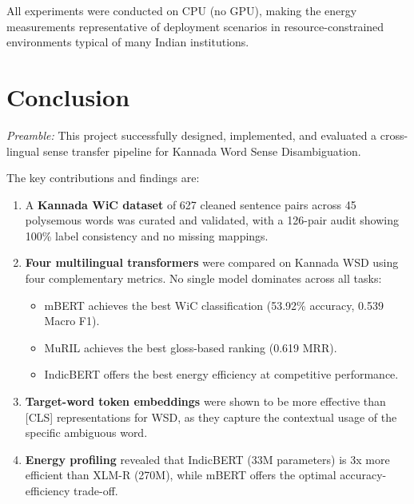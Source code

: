\documentclass[12pt,a4paper,oneside]{article}
\begin{document}
All experiments were conducted on CPU (no GPU), making the energy measurements representative of deployment scenarios in resource-constrained environments typical of many Indian institutions.

\clearpage

\section{Conclusion}

\textit{Preamble:} This project successfully designed, implemented, and evaluated a cross-lingual sense transfer pipeline for Kannada Word Sense Disambiguation.

The key contributions and findings are:

\begin{enumerate}[leftmargin=*]
  \item A \textbf{Kannada WiC dataset} of 627 cleaned sentence pairs across 45 polysemous words was curated and validated, with a 126-pair audit showing 100\% label consistency and no missing mappings.

  \item \textbf{Four multilingual transformers} were compared on Kannada WSD using four complementary metrics. No single model dominates across all tasks:
  \begin{itemize}
    \item mBERT achieves the best WiC classification (53.92\% accuracy, 0.539 Macro F1).
    \item MuRIL achieves the best gloss-based ranking (0.619 MRR).
    \item IndicBERT offers the best energy efficiency at competitive performance.
  \end{itemize}

  \item \textbf{Target-word token embeddings} were shown to be more effective than [CLS] representations for WSD, as they capture the contextual usage of the specific ambiguous word.

  \item \textbf{Energy profiling} revealed that IndicBERT (33M parameters) is 3x more efficient than XLM-R (270M), while mBERT offers the optimal accuracy-efficiency trade-off.
\end{enumerate}
\end{document}
